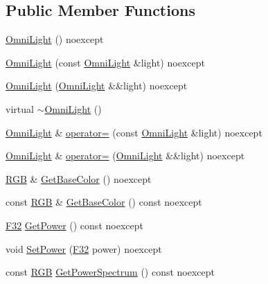 \subsection*{Public Member Functions}
\begin{DoxyCompactItemize}
\item 
\hyperlink{classmage_1_1rendering_1_1_omni_light_a641472ade99dc84b6e82e3d01d8b574a}{Omni\+Light} () noexcept
\item 
\hyperlink{classmage_1_1rendering_1_1_omni_light_adc27e555c730dbe8891e6ac4eb9d3900}{Omni\+Light} (const \hyperlink{classmage_1_1rendering_1_1_omni_light}{Omni\+Light} \&light) noexcept
\item 
\hyperlink{classmage_1_1rendering_1_1_omni_light_a235afcf044e62a3f6672316eb8f3cd99}{Omni\+Light} (\hyperlink{classmage_1_1rendering_1_1_omni_light}{Omni\+Light} \&\&light) noexcept
\item 
virtual \hyperlink{classmage_1_1rendering_1_1_omni_light_af0981e056620d3f0df827098448c8052}{$\sim$\+Omni\+Light} ()
\item 
\hyperlink{classmage_1_1rendering_1_1_omni_light}{Omni\+Light} \& \hyperlink{classmage_1_1rendering_1_1_omni_light_aac914061f6798131e7f59275b4716b48}{operator=} (const \hyperlink{classmage_1_1rendering_1_1_omni_light}{Omni\+Light} \&light) noexcept
\item 
\hyperlink{classmage_1_1rendering_1_1_omni_light}{Omni\+Light} \& \hyperlink{classmage_1_1rendering_1_1_omni_light_a8126d5d0d3a45d0063c3fd2f28e3826e}{operator=} (\hyperlink{classmage_1_1rendering_1_1_omni_light}{Omni\+Light} \&\&light) noexcept
\item 
\hyperlink{structmage_1_1_r_g_b}{R\+GB} \& \hyperlink{classmage_1_1rendering_1_1_omni_light_a408bde4df7fd40750cb0e4dd4d2f6d1a}{Get\+Base\+Color} () noexcept
\item 
const \hyperlink{structmage_1_1_r_g_b}{R\+GB} \& \hyperlink{classmage_1_1rendering_1_1_omni_light_a6c68ed32167890c1b0f01130c610c3e2}{Get\+Base\+Color} () const noexcept
\item 
\hyperlink{namespacemage_aa97e833b45f06d60a0a9c4fc22ae02c0}{F32} \hyperlink{classmage_1_1rendering_1_1_omni_light_a43c6be5649668705ffb1ace363960b00}{Get\+Power} () const noexcept
\item 
void \hyperlink{classmage_1_1rendering_1_1_omni_light_a1887bf9c7f732188814b34f686638443}{Set\+Power} (\hyperlink{namespacemage_aa97e833b45f06d60a0a9c4fc22ae02c0}{F32} power) noexcept
\item 
const \hyperlink{structmage_1_1_r_g_b}{R\+GB} \hyperlink{classmage_1_1rendering_1_1_omni_light_a82366151b99cc4791d8b361331f75833}{Get\+Power\+Spectrum} () const noexcept

\end{DoxyCompactItemize}
